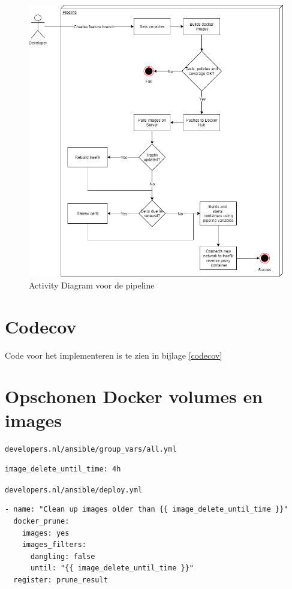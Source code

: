 \begin{figure}[h]
	\centering
	\includegraphics[width=13cm]{Figures/Activitydiagram}
	\decoRule
	\caption[Pipeline Activity Diagram]{Activity Diagram voor de pipeline}
	\label{fig:activitydiagram}
\end{figure}

\section{Codecov}
Code voor het implementeren is te zien in bijlage \ref{codecov}

\section{Opschonen Docker volumes en images}
\texttt{developers.nl/ansible/group\_vars/all.yml}
\begin{verbatim}
image_delete_until_time: 4h
\end{verbatim}
\texttt{developers.nl/ansible/deploy.yml}
\begin{verbatim}
- name: "Clean up images older than {{ image_delete_until_time }}"
  docker_prune:
    images: yes
    images_filters:
      dangling: false
      until: "{{ image_delete_until_time }}"
  register: prune_result
\end{verbatim}

